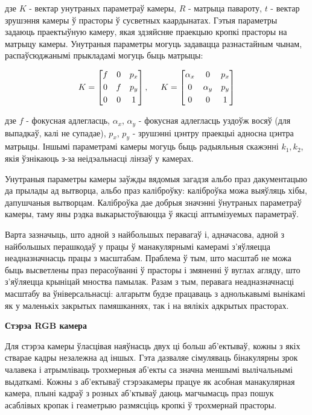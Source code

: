 дзе $K$ - вектар унутраных параметраў камеры, $R$ - матрыца павароту, $t$ - вектар
зрушэння камеры ў прасторы ў сусветных каардынатах. Гэтыя параметры задаюць праектыўную
камеру, якая здзяйсняе праекцыю кропкі прасторы на матрыцу камеры. Унутраныя параметры могуць
задавацца разнастайным чынам, распаўсюджанымі прыкладамі могуць быць матрыцы:

\begin{equation}
  K = \begin{bmatrix}
    f & 0 & p_x \\[0.3em]
    0 & f & p_y \\[0.3em]
    0 & 0 & 1
  \end{bmatrix},
  \hspace{5mm}
  K = \begin{bmatrix}
    \alpha_x & 0 & p_x \\[0.3em]
    0 & \alpha_y & p_y \\[0.3em]
    0 & 0 & 1
  \end{bmatrix}
\end{equation}

дзе $f$ - фокусная адлегласць, $\alpha_x$, $\alpha_y$ - фокусная адлегласць уздоўж восяў
(для выпадкаў, калі не супадае), $p_x$, $p_y$ - зрушэнні цэнтру праекцыі адносна цэнтра матрыцы.
Іншымі параметрамі камеры могуць быць радыяльныя скажэнні $k_1, k_2$, якія ўзнікаюць з-за неідэальнасці
лінзаў у камерах.

Унутраныя параметры камеры заўжды вядомыя загадзя альбо праз дакументацыю да прылады ад
вытворца, альбо праз каліброўку: каліброўка можа выяўляць хібы, дапушчаныя вытворцам.
Каліброўка дае добрыя значэнні ўнутраных параметраў
камеры, таму яны рэдка выкарыстоўваюцца ў якасці аптымізуемых параметраў.

Варта зазначыць, што адной з найбольшых перавагаў і, адначасова, адной з найбольшых
перашкодаў у працы ў манакулярнымі камерамі з'яўляецца неадназначнасць працы з масштабам.
Праблема ў тым, што масштаб не можа быць высветлены праз перасоўванні ў прасторы і
змяненні ў вуглах агляду, што з'яўляецца крыніцай мноства памылак. Разам з тым,
перавага неадназначнасці масштабу ва ўніверсальнасці: алгарытм будзе працаваць
з аднолькавымі вынікамі як у маленькіх закрытых памяшканнях, так і на вялікіх
адкрытых прасторах.

\vspace{5mm}
{\bf Стэрэа RGB камера}

Для стэрэа камеры ўласцівая наяўнасць двух ці больш аб'ектываў, кожны з якіх
стварае кадры незалежна ад іншых. Гэта дазваляе сімуляваць бінакулярны зрок чалавека
і атрымліваць трохмерныя аб'екты са значна меншымі вылічальнымі выдаткамі.
Кожны з аб'ектываў стэрэакамеры працуе як асобная манакулярная камера, плыні кадраў
з розных аб'ктываў даюць магчымасць праз пошук асаблівых кропак і геаметрыю
размясціць кропкі ў трохмернай прасторы.

